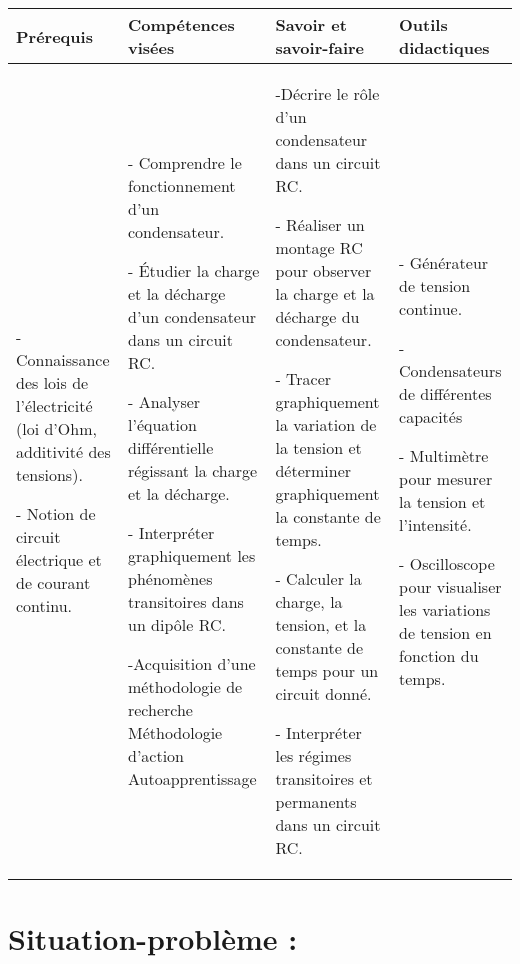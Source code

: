 \documentclass[12pt]{article}
\begin{document}
\begin{center}
	\begin{tabular}{|p{}||p{}||p{}||p{}|}
		\hline
		\textbf{Prérequis} & \textbf{Compétences visées }     & \textbf{Savoir et savoir-faire} & \textbf{Outils didactiques } \\
		\hline
		- Connaissance des lois de l’électricité (loi d’Ohm, additivité des tensions).

		- Notion de circuit électrique et de courant continu.
		                   &
		- Comprendre le fonctionnement d’un condensateur.

		- Étudier la charge et la décharge d’un condensateur dans un circuit RC.

		- Analyser l’équation différentielle régissant la charge et la décharge.

		- Interpréter graphiquement les phénomènes transitoires dans un dipôle RC.

		-Acquisition d'une
		méthodologie de recherche
		Méthodologie d'action Autoapprentissage

		                   &

		-Décrire le rôle d’un condensateur dans un circuit RC.

 - Réaliser un montage RC pour observer la charge et la décharge du condensateur.

 - Tracer graphiquement la variation de la tension  et déterminer graphiquement la constante de temps.

 - Calculer la charge, la tension, et la constante de temps pour un circuit donné.

    - Interpréter les régimes transitoires et permanents dans un circuit RC.

    & 
    - Générateur de tension continue.

    - Condensateurs de différentes capacités 

    -   Multimètre pour mesurer la tension et l’intensité.

    - Oscilloscope pour visualiser les variations de tension en fonction du temps.


    \\
		\hline
	\end{tabular}
\end{center}
\section*{Situation-problème :}
\end{document}
